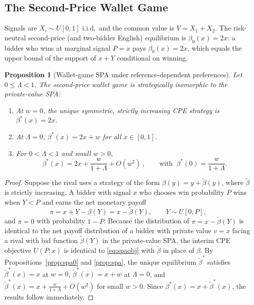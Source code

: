 \documentclass[11pt,a4paper]{article}
\newtheorem{proposition}{Proposition}
\theoremstyle{remark}
\begin{document}
\subsection{The Second-Price Wallet Game}
\label{sec:walletspsa}
Signals are $X_i\sim U[0,1]$ i.i.d.\ and the common value is $V=X_1+X_2$. The
risk-neutral second-price (and two-bidder English) equilibrium is $\beta_0(x)=2x$: a
bidder who wins at marginal signal $P=x$ pays $\beta_0(x)=2x$, which equals the
upper bound of the support of $x+Y$ conditional on winning.

\begin{proposition}[Wallet-game SPA under reference-dependent preferences]
\label{prop:walletspsa}
Let $0\le\Lambda<1$. The second-price wallet game is strategically isomorphic to the
private-value SPA:
\begin{enumerate}
\item[(i)] At $w=0$, the unique symmetric, strictly increasing CPE strategy is
$\boxed{\beta^{*}(x)=2x}$.
\item[(ii)] At $\Lambda=0$, $\beta^{*}(x)=2x+w$ for all $x\in[0,1]$.
\item[(iii)] For $0<\Lambda<1$ and small $w>0$,
\begin{equation}
\boxed{\ \beta^{*}(x)=2x+\frac{w}{1+\Lambda}+O(w^{2})\ },
\qquad \text{with }\ \beta^{*}(0)=\frac{w}{1+\Lambda}.
\end{equation}
\end{enumerate}
\end{proposition}

\begin{proof}
Suppose the rival uses a strategy of the form $\beta(y)=y+\tilde\beta(y)$, where
$\tilde\beta$ is strictly increasing. A bidder with signal $x$ who chooses win
probability $P$ wins when $Y<P$ and earns the net monetary payoff
\begin{equation}
\pi = x + Y - \beta(Y) = x - \tilde\beta(Y), \qquad Y\sim U[0,P],
\end{equation}
and $\pi=0$ with probability $1-P$. Because the distribution of $\pi=x-\tilde\beta(Y)$
is identical to the net payoff distribution of a bidder with private value $v=x$ facing
a rival with bid function $\tilde\beta(Y)$ in the private-value SPA, the interim CPE
objective $U(P;x)$ is identical to \eqref{eq:spaobj} with $\tilde\beta$ in place of
$\beta$. By Propositions~\ref{prop:spa0} and \ref{prop:spa}, the unique equilibrium
$\tilde\beta^*$ satisfies $\tilde\beta^*(x)=x$ at $w=0$, $\tilde\beta^*(x)=x+w$ at
$\Lambda=0$, and $\tilde\beta^*(x)=x+\frac{w}{1+\Lambda}+O(w^2)$ for small $w>0$.
Since $\beta^*(x)=x+\tilde\beta^*(x)$, the results follow immediately.
\end{proof}
\end{document}
